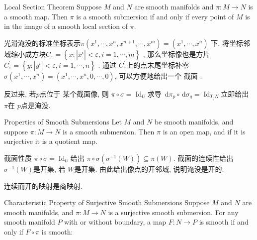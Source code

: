 \documentclass[../main.tex]{subfiles}
\begin{document}
\begin{theorem}{Local Section Theorem}{}
Suppose $M$ and $N$ are smooth manifolds and $\pi : M \to N$ is a smooth map. Then $\pi$ is a smooth submersion if and only if every point of $M$ is in the image of a smooth local section of $\pi$.
\end{theorem}

\begin{proofsketch}
    光滑淹没的标准坐标表示\(   \pi \left( x^{1},\cdots ,x^{n},x^{n+ 1},\cdots ,x^{m} \right)  = \left( x^{1},\cdots ,x^{n} \right)  \) 下, 将坐标邻域缩小成方块\(  C_{ \varepsilon } = \left\{ x: \left| x^{i} \right|<  \varepsilon ,i=  1,\cdots,m   \right\} \) , 那么坐标像也是方片\(  C_{ \varepsilon }^{\prime} = \left\{ y: \left| y^{i} \right|<  \varepsilon , i=  1,\cdots,n   \right\}  \) . 通过 \(  C_{ \varepsilon }^{\prime}   \)上的点末尾坐标补零\(   \sigma \left( x^{1},\cdots ,x^{n} \right)= \left( x^{1},\cdots ,x^{n},0,\cdots ,0 \right)    \), 可以方便地给出一个 截面 .

    反过来, 若\(  p  \)点位于 某个截面像, 则 \(   \pi  \circ  \sigma = \operatorname{Id}_{U}  \)求导 \(  \,\mathrm{d}  \pi _{p}\circ \,\mathrm{d}  \sigma _{q}= \operatorname{Id}_{T_{q}N}  \)立即给出  \(   \pi   \)在 \(  p  \)点是淹没.  
\end{proofsketch}

\begin{proposition}{Properties of Smooth Submersions}{}
Let $M$ and $N$ be smooth manifolds, and suppose $\pi : M \to N$ is a smooth submersion. Then $\pi$ is an open map, and if it is surjective it is a quotient map.
\end{proposition}

\begin{proofsketch}
    截面性质 \(   \pi \circ  \sigma = \operatorname{Id}_{U}  \)给出 \(   \pi \circ  \sigma \left(  \sigma ^{-1} \left( W \right)  \right)\subseteq  \pi \left( W \right)    \). 截面的连续性给出 \(   \sigma ^{-1} \left( W \right)   \)是开集, 若 \(  W  \)是开集. 由此给出像点的开邻域, 说明淹没是开的.    

    连续而开的映射是商映射.
\end{proofsketch}

\begin{theorem}{Characteristic Property of Surjective Smooth Submersions}{}
Suppose $M$ and $N$ are smooth manifolds, and $\pi : M \to N$ is a surjective smooth submersion. For any smooth manifold $P$ with or without boundary, a map $F : N \to P$ is smooth if and only if $F \circ \pi$ is smooth:
\begin{center}
\end{center}
\end{theorem}
\end{document}
